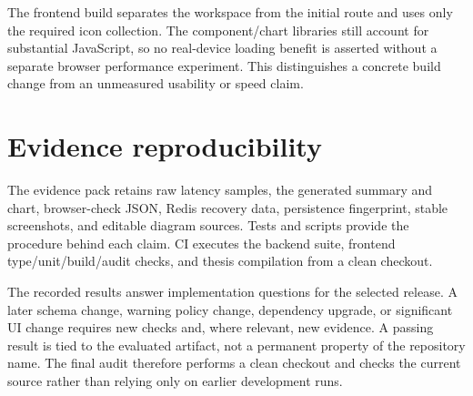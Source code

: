 The frontend build separates the workspace from the initial route and uses only the required icon collection. The component/chart libraries still account for substantial JavaScript, so no real-device loading benefit is asserted without a separate browser performance experiment. This distinguishes a concrete build change from an unmeasured usability or speed claim.

\section{Evidence reproducibility}
The evidence pack retains raw latency samples, the generated summary and chart, browser-check JSON, Redis recovery data, persistence fingerprint, stable screenshots, and editable diagram sources. Tests and scripts provide the procedure behind each claim. CI executes the backend suite, frontend type/unit/build/audit checks, and thesis compilation from a clean checkout.

The recorded results answer implementation questions for the selected release. A later schema change, warning policy change, dependency upgrade, or significant UI change requires new checks and, where relevant, new evidence. A passing result is tied to the evaluated artifact, not a permanent property of the repository name. The final audit therefore performs a clean checkout and checks the current source rather than relying only on earlier development runs.
